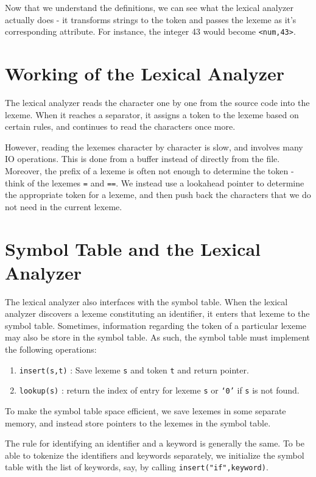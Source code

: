 \documentclass[12pt,letterpaper]{book}
\theoremstyle{definition}
\begin{document}
Now that we understand the definitions, we can see what the lexical analyzer actually does - it transforms strings to the token and passes the lexeme as it's corresponding attribute. For instance, the integer 43 would become \texttt{<num,43>}.

\section{Working of the Lexical Analyzer}

The lexical analyzer reads the character one by one from the source code into the lexeme. When it reaches a separator, it assigns a token to the lexeme based on certain rules, and continues to read the characters once more.

However, reading the lexemes character by character is slow, and involves many IO operations. This is done from a buffer instead of directly from the file. Moreover, the prefix of a lexeme is often not enough to determine the token - think of the lexemes \texttt{=} and \texttt{==}. We instead use a lookahead pointer to determine the appropriate token for a lexeme, and then push back the characters that we do not need in the current lexeme.

\section{Symbol Table and the Lexical Analyzer}

The lexical analyzer also interfaces with the symbol table. When the lexical analyzer discovers a lexeme constituting an identifier, it enters that lexeme to the symbol table. Sometimes, information regarding the token of a particular lexeme may also be store in the symbol table. As such, the symbol table must implement the following operations:

\begin{enumerate}
  \item \texttt{insert(s,t)} : Save lexeme \texttt{s} and token \texttt{t} and return pointer.
  \item \texttt{lookup(s)} : return the index of entry for lexeme \texttt{s} or \texttt{`0'} if \texttt{s} is not found.
\end{enumerate}

To make the symbol table space efficient, we save lexemes in some separate memory, and instead store pointers to the lexemes in the symbol table.

The rule for identifying an identifier and a keyword is generally the same. To be able to tokenize the identifiers and keywords separately, we initialize the symbol table with the list of keywords, say, by calling \texttt{insert("if",keyword)}.
\end{document}
